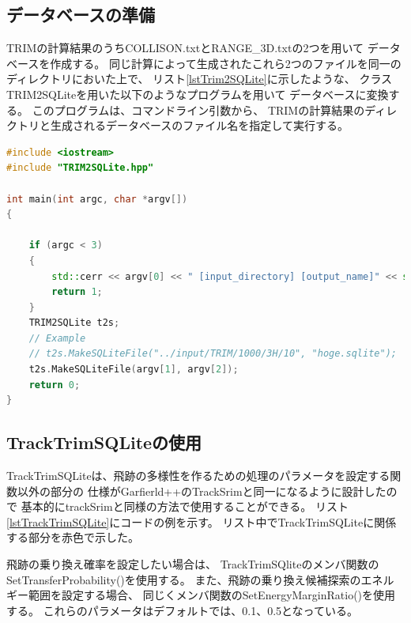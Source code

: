 \documentclass [11pt,a4paper,dvipdfmx] {jarticle}
\begin{document}
\subsection{データベースの準備}
TRIMの計算結果のうちCOLLISON.txtとRANGE\_3D.txtの2つを用いて
データベースを作成する。
同じ計算によって生成されたこれら2つのファイルを同一のディレクトリにおいた上で、
リスト\ref{lstTrim2SQLite}に示したような、
クラスTRIM2SQLiteを用いた以下のようなプログラムを用いて
データベースに変換する。
このプログラムは、コマンドライン引数から、
TRIMの計算結果のディレクトリと生成されるデータベースのファイル名を指定して実行する。

\begin{lstlisting}[language=C++, caption=makdb.cpp (TRIMの計算結果をSQLiteのデータベースに変換するプログラム。),label=lstTrim2SQLite]
#include <iostream>
#include "TRIM2SQLite.hpp"

int main(int argc, char *argv[])
{

    if (argc < 3)
    {
        std::cerr << argv[0] << " [input_directory] [output_name]" << std::endl;
        return 1;
    }
    TRIM2SQLite t2s;
    // Example
    // t2s.MakeSQLiteFile("../input/TRIM/1000/3H/10", "hoge.sqlite");
    t2s.MakeSQLiteFile(argv[1], argv[2]);
    return 0;
}
\end{lstlisting}


\subsection{TrackTrimSQLiteの使用}
TrackTrimSQLiteは、飛跡の多様性を作るための処理のパラメータを設定する関数以外の部分の
仕様がGarfierld++のTrackSrimと同一になるように設計したので
基本的にtrackSrimと同様の方法で使用することができる。
リスト\ref{lstTrackTrimSQLite}にコードの例を示す。
リスト中でTrackTrimSQLiteに関係する部分を赤色で示した。

飛跡の乗り換え確率を設定したい場合は、
TrackTrimSQliteのメンバ関数のSetTransferProbability()を使用する。
また、飛跡の乗り換え候補探索のエネルギー範囲を設定する場合、
同じくメンバ関数のSetEnergyMarginRatio()を使用する。
これらのパラメータはデフォルトでは、0.1、0.5となっている。
\end{document}
